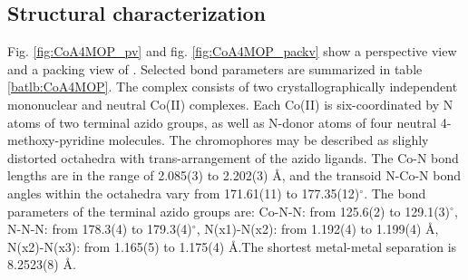 \newpage
\subsection{Structural characterization}

Fig. \ref{fig:CoA4MOP_pv} and fig. \ref{fig:CoA4MOP_packv} show a perspective view and a packing view of  \ce{[Co(N_3)_2(4-MeOpy)_4]}. Selected bond parameters are summarized in table \ref{batlb:CoA4MOP}. The complex consists of two crystallographically independent mononuclear and neutral Co(II) complexes. Each Co(II) is six-coordinated by N atoms of two terminal azido groups, as well as N-donor atoms of four neutral 4-methoxy-pyridine molecules. The  chromophores may be described as slighly distorted octahedra with trans-arrangement of the azido ligands. The Co-N bond lengths are in the range of 2.085(3) to 2.202(3) \AA , and the transoid N-Co-N bond angles within the  octahedra vary from 171.61(11) to 177.35(12)$^\circ$. The bond parameters of the terminal azido groups are: Co-N-N: from 125.6(2) to 129.1(3)$^\circ$, N-N-N: from 178.3(4) to 179.3(4)$^\circ$, N(x1)-N(x2): from 1.192(4) to 1.199(4) \AA, N(x2)-N(x3): from 1.165(5) to 1.175(4) \AA.The shortest metal-metal separation is 8.2523(8) \AA. 


